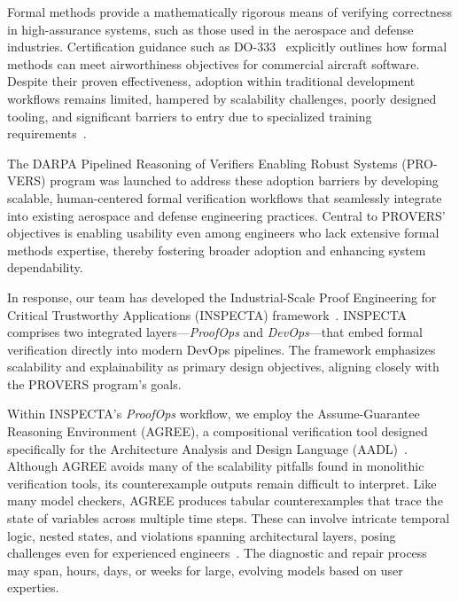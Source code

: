 Formal methods provide a mathematically rigorous means of verifying correctness in high-assurance systems, such as those used in the aerospace and defense industries. Certification guidance such as DO-333~\cite{DO-333} explicitly outlines how formal methods can meet airworthiness objectives for commercial aircraft software. Despite their proven effectiveness, adoption within traditional development workflows remains limited, hampered by scalability challenges, poorly designed tooling, and significant barriers to entry due to specialized training requirements~\cite{davis-fmics13}.

The DARPA Pipelined Reasoning of Verifiers Enabling Robust Systems (PRO-VERS) program was launched to address these adoption barriers by developing scalable, human-centered formal verification workflows that seamlessly integrate into existing aerospace and defense engineering practices. Central to PROVERS' objectives is enabling usability even among engineers who lack extensive formal methods expertise, thereby fostering broader adoption and enhancing system dependability.

In response, our team has developed the Industrial-Scale Proof Engineering for Critical Trustworthy Applications (INSPECTA) framework~\cite{inspecta-url}. INSPECTA comprises two integrated layers—\textit{ProofOps} and \textit{DevOps}—that embed formal verification directly into modern DevOps pipelines. The framework emphasizes scalability and explainability as primary design objectives, aligning closely with the PROVERS program’s goals.

Within INSPECTA’s \textit{ProofOps} workflow, we employ the Assume-Guarantee Reasoning Environment (AGREE)\cite{compositional-analysis-agree}, a compositional verification tool designed specifically for the Architecture Analysis and Design Language (AADL)~\cite{feiler-aadl}.
%
Although AGREE avoids many of the scalability pitfalls found in monolithic verification tools, its counterexample outputs remain difficult to interpret. Like many model checkers, AGREE produces tabular counterexamples that trace the state of variables across multiple time steps. These can involve intricate temporal logic, nested states, and violations spanning architectural layers, posing challenges even for experienced engineers~\cite{cex-explanation}. The diagnostic and repair process may span, hours, days, or weeks for large, evolving models based on user experties.

